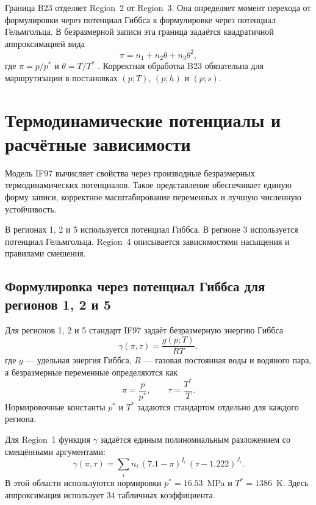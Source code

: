 Граница B23 отделяет Region~2 от Region~3.
Она определяет момент перехода
от формулировки через потенциал Гиббса
к формулировке через потенциал Гельмгольца.
В безразмерной записи эта граница задаётся
квадратичной аппроксимацией вида
\begin{equation}
\pi = n_{1} + n_{2}\theta + n_{3}\theta^{2},
\end{equation}
где $\pi = p/p^{*}$ и $\theta = T/T^{*}$ \cite{iapws_if97_2012}.
Корректная обработка B23 обязательна
для маршрутизации в постановках $(p; T)$, $(p; h)$ и $(p; s)$.

\section{Термодинамические потенциалы и расчётные зависимости}

Модель IF97 вычисляет свойства через производные
безразмерных термодинамических потенциалов.
Такое представление обеспечивает единую форму записи,
корректное масштабирование переменных
и лучшую численную устойчивость.

В регионах 1, 2 и 5 используется потенциал Гиббса.
В регионе 3 используется потенциал Гельмгольца.
Region~4 описывается зависимостями насыщения и правилами смешения.

\subsection{Формулировка через потенциал Гиббса для регионов 1, 2 и 5}

Для регионов 1, 2 и 5 стандарт IF97 задаёт безразмерную энергию Гиббса
\begin{equation}
\gamma(\pi, \tau) = \frac{g(p; T)}{R T},
\end{equation}
где $g$ --- удельная энергия Гиббса, $R$ --- газовая постоянная воды и водяного пара,
а безразмерные переменные определяются как
\begin{equation}
\pi = \frac{p}{p^{*}}, \qquad \tau = \frac{T^{*}}{T}.
\end{equation}
Нормировочные константы $p^{*}$ и $T^{*}$ задаются стандартом отдельно для каждого региона.

Для Region~1 функция $\gamma$ задаётся единым полиномиальным разложением
со смещёнными аргументами:
\begin{equation}
\gamma(\pi,\tau) = \sum_{i} n_{i}\,(7.1-\pi)^{I_{i}}\,(\tau-1.222)^{J_{i}}.
\end{equation}
В этой области используются нормировки
$p^{*}=16.53$~MPa и $T^{*}=1386$~K.
Здесь аппроксимация использует $34$ табличных коэффициента.


